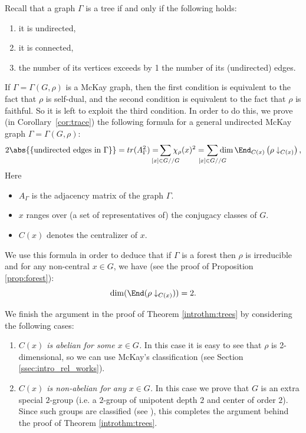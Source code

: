 Recall that a graph $\Gamma$ is a tree if and only if the following holds:
\begin{enumerate}[label=(\alph*)]
    \item it is undirected,
    \item it is connected,
    \item the number of its vertices exceeds by 1 the number of its (undirected) edges.
\end{enumerate}
If $\Gamma=\Gamma(G,\rho)$ is a McKay graph,  then the first condition is equivalent to the fact that $\rho$ is self-dual, and the second condition is equivalent to the fact that $\rho$ is faithful. So it is left to exploit the third condition. In order to do this, we prove (in Corollary~\ref{cor:trace}) the following formula for a general undirected McKay graph $\Gamma = \Gamma(G, \rho)$:
\begin{equation}\label{eq:dim.formula}
2\abs{\{\text{undirected edges in } \Gamma\}}=tr(A_\Gamma^2)= \hspace{-0.4cm} \sum_{[x]\in G//G}  \hspace{-0.35cm} \chi_\rho(x)^2 =  \hspace{-0.35cm} \sum_{[x]\in G//G}  \hspace{-0.35cm} \dim \End_{C(x)}\left( \rho\downarrow_{C(x)}\right),
\end{equation}
Here
\begin{itemize}
    \item $A_\Gamma$ is the adjacency matrix of the graph $\Gamma$.
    \item $x$ ranges over (a set of representatives of) the conjugacy classes of $G$.
    \item $C(x)$ denotes the centralizer of $x$.
\end{itemize}

We use this formula in order to deduce that if $\Gamma$ is a forest then $\rho$ is irreducible and for any non-central $x \in G$, we have (see the proof of Proposition \ref{prop:forest}): \begin{equation}\label{eq:dim2}
\dim(\End(\rho\downarrow_{C(x)}))=2.    
\end{equation}



We finish the argument in the proof of Theorem \ref{introthm:trees} by considering the following cases:
\begin{enumerate}[label=(\alph*)]
    \item {\it $C(x)$ is abelian for some $x\in G$.} 
    In this case it is easy to see that $\rho$ is 2-dimensional, 
    so we can use McKay's classification (see Section \ref{ssec:intro_rel_works}).
    \item {\it $C(x)$ is non-abelian for any $x\in G$.}
    In this case we prove that $G$ is an extra special $2$-group (i.e. a  $2$-group of unipotent depth $2$ and center of order $2$). Since such groups are classified (see \cite{Aschbacher, Diaconis}), this completes the argument behind the proof of Theorem \ref{introthm:trees}.
\end{enumerate}
